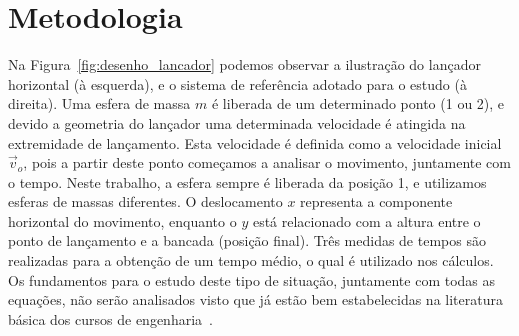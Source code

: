 \documentclass[11pt,a4paper]{article}
\begin{document}










\section{Metodologia}


Na Figura~\ref{fig:desenho_lancador} podemos observar a ilustração do lançador horizontal (à esquerda), e o sistema de referência adotado para o estudo (à direita).
Uma esfera de massa $m$ é liberada de um determinado ponto (1 ou 2), e devido a geometria do lançador uma determinada velocidade é atingida na extremidade de lançamento.
Esta velocidade é definida como a velocidade inicial $\vec{v}_o$, pois a partir deste ponto começamos a analisar o movimento, juntamente com o tempo.
Neste trabalho, a esfera sempre é liberada da posição 1, e utilizamos esferas de massas diferentes.
O deslocamento $x$ representa a componente horizontal do movimento, enquanto o $y$ está relacionado com a altura entre o ponto de lançamento e a bancada (posição final).
Três medidas de tempos são realizadas para a obtenção de um tempo médio, o qual é utilizado nos cálculos.
Os fundamentos para o estudo deste tipo de situação, juntamente com todas as equações, não serão analisados visto que já estão bem estabelecidas na literatura básica dos cursos de engenharia~\cite{Resnick2012v1, Moyses2013v1}.
\end{document}
